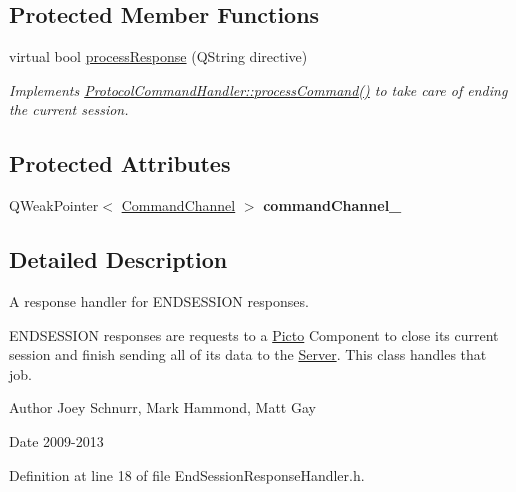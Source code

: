\subsection*{Protected Member Functions}
\begin{DoxyCompactItemize}
\item 
virtual bool \hyperlink{struct_picto_1_1_end_session_response_handler_aa8a23275f73e69c89dd2857c64eeaeff}{process\-Response} (Q\-String directive)
\begin{DoxyCompactList}\small\item\em Implements \hyperlink{struct_picto_1_1_protocol_command_handler_aeeaa16fe40f10fd55996d74e16e29cad}{Protocol\-Command\-Handler\-::process\-Command()} to take care of ending the current session. \end{DoxyCompactList}\end{DoxyCompactItemize}
\subsection*{Protected Attributes}
\begin{DoxyCompactItemize}
\item 
\hypertarget{struct_picto_1_1_end_session_response_handler_afd90e05c7d10a3b014ebf91a018d5539}{Q\-Weak\-Pointer$<$ \hyperlink{class_picto_1_1_command_channel}{Command\-Channel} $>$ {\bfseries command\-Channel\-\_\-}}\label{struct_picto_1_1_end_session_response_handler_afd90e05c7d10a3b014ebf91a018d5539}

\end{DoxyCompactItemize}


\subsection{Detailed Description}
A response handler for E\-N\-D\-S\-E\-S\-S\-I\-O\-N responses. 

E\-N\-D\-S\-E\-S\-S\-I\-O\-N responses are requests to a \hyperlink{namespace_picto}{Picto} Component to close its current session and finish sending all of its data to the \hyperlink{class_server}{Server}. This class handles that job. \begin{DoxyAuthor}{Author}
Joey Schnurr, Mark Hammond, Matt Gay 
\end{DoxyAuthor}
\begin{DoxyDate}{Date}
2009-\/2013 
\end{DoxyDate}


Definition at line 18 of file End\-Session\-Response\-Handler.\-h.



